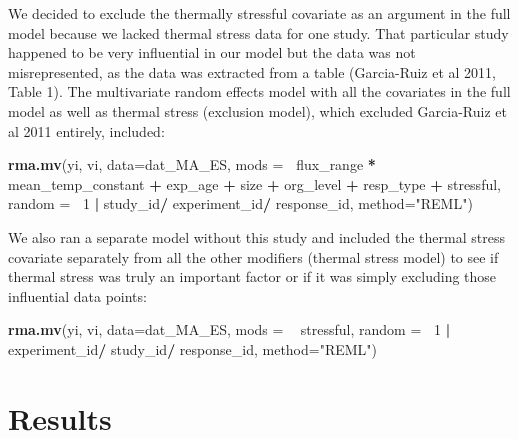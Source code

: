 \documentclass[12pt,twoside]{reedthesis}
\newenvironment{Shaded}{\begin{snugshade}}{\end{snugshade}}
\newcommand{\DataTypeTok}[1]{\textcolor[rgb]{0.13,0.29,0.53}{#1}}
\newcommand{\DecValTok}[1]{\textcolor[rgb]{0.00,0.00,0.81}{#1}}
\newcommand{\KeywordTok}[1]{\textcolor[rgb]{0.13,0.29,0.53}{\textbf{#1}}}
\newcommand{\NormalTok}[1]{#1}
\newcommand{\OperatorTok}[1]{\textcolor[rgb]{0.81,0.36,0.00}{\textbf{#1}}}
\newcommand{\StringTok}[1]{\textcolor[rgb]{0.31,0.60,0.02}{#1}}
\begin{document}
We decided to exclude the thermally stressful covariate as an argument in the full model because we lacked thermal stress data for one study. That particular study happened to be very influential in our model but the data was not misrepresented, as the data was extracted from a table (Garcia-Ruiz et al 2011, Table 1). The multivariate random effects model with all the covariates in the full model as well as thermal stress (exclusion model), which excluded Garcia-Ruiz et al 2011 entirely, included:
\begin{Shaded}
\begin{Highlighting}[]
\KeywordTok{rma.mv}\NormalTok{(yi, vi, }\DataTypeTok{data=}\NormalTok{dat_MA_ES, }\DataTypeTok{mods =} \OperatorTok{~}\NormalTok{flux_range }\OperatorTok{*}\StringTok{ }\NormalTok{mean_temp_constant }
       \OperatorTok{+}\StringTok{ }\NormalTok{exp_age }\OperatorTok{+}\StringTok{ }\NormalTok{size }\OperatorTok{+}\StringTok{ }\NormalTok{org_level }\OperatorTok{+}\StringTok{ }\NormalTok{resp_type }\OperatorTok{+}\StringTok{ }\NormalTok{stressful, }
               \DataTypeTok{random =} \OperatorTok{~}\DecValTok{1} \OperatorTok{|}\StringTok{  }\NormalTok{study_id}\OperatorTok{/}\StringTok{ }\NormalTok{experiment_id}\OperatorTok{/}\StringTok{ }\NormalTok{response_id,}
                 \DataTypeTok{method=}\StringTok{"REML"}\NormalTok{) }
\end{Highlighting}
\end{Shaded}
We also ran a separate model without this study and included the thermal stress covariate separately from all the other modifiers (thermal stress model) to see if thermal stress was truly an important factor or if it was simply excluding those influential data points:
\begin{Shaded}
\begin{Highlighting}[]
\KeywordTok{rma.mv}\NormalTok{(yi, vi, }\DataTypeTok{data=}\NormalTok{dat_MA_ES, }\DataTypeTok{mods =}  \OperatorTok{~}\StringTok{ }\NormalTok{stressful, }
               \DataTypeTok{random =} \OperatorTok{~}\DecValTok{1} \OperatorTok{|}\StringTok{ }\NormalTok{experiment_id}\OperatorTok{/}\StringTok{ }\NormalTok{study_id}\OperatorTok{/}\StringTok{ }\NormalTok{response_id,}
                 \DataTypeTok{method=}\StringTok{"REML"}\NormalTok{) }
\end{Highlighting}
\end{Shaded}
\hypertarget{results}{%
\chapter{Results}\label{results}}
\end{document}
